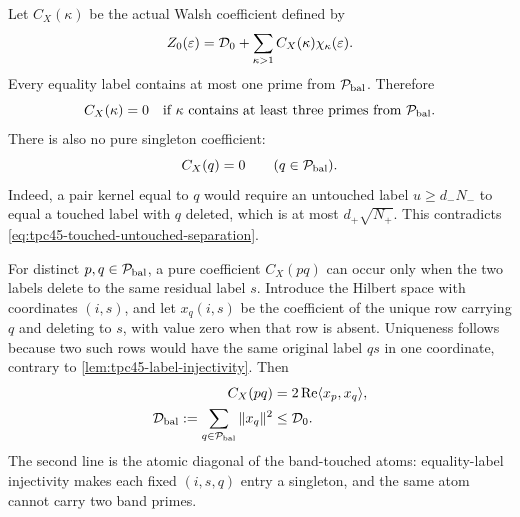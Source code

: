 Let \(C_X(\kappa)\) be the actual Walsh coefficient defined by
\begin{equation}
 Z_0(\varepsilon)
 =\mathcal D_0+\sum_{\kappa>1}C_X(\kappa)\chi_\kappa(\varepsilon).
 \label{eq:tpc45-CX-definition}
\end{equation}
Every equality label contains at most one prime from
\(\mathcal P_{\rm bal}\).  Therefore
\begin{equation}
 C_X(\kappa)=0
 \quad\text{if \(\kappa\) contains at least three primes from
 \(\mathcal P_{\rm bal}\)}.
 \label{eq:tpc45-no-three-band-primes}
\end{equation}
There is also no pure singleton coefficient:
\begin{equation}
 C_X(q)=0
 \qquad(q\in\mathcal P_{\rm bal}).
 \label{eq:tpc45-no-pure-singleton}
\end{equation}
Indeed, a pair kernel equal to \(q\) would require an untouched label
\(u\ge d_-N_-\) to equal a touched label with \(q\) deleted, which is
at most \(d_+\sqrt{N_+}\).  This contradicts
\eqref{eq:tpc45-touched-untouched-separation}.

For distinct \(p,q\in\mathcal P_{\rm bal}\), a pure coefficient \(C_X(pq)\)
can occur only when the two labels delete to the same residual label
\(s\).  Introduce the Hilbert space with coordinates \((i,s)\), and
let \(x_q(i,s)\) be the coefficient of the unique row carrying \(q\)
and deleting to \(s\), with value zero when that row is absent.
Uniqueness follows because two such rows would have the same original
label \(qs\) in one coordinate, contrary to
\cref{lem:tpc45-label-injectivity}.  Then
\begin{align}
 C_X(pq)&=2\operatorname{Re}\langle x_p,x_q\rangle,
 \label{eq:tpc45-Cpq-Gram}\\
 \mathcal D_{\rm bal}
 :=\sum_{q\in\mathcal P_{\rm bal}}\|x_q\|^2
 &\le\mathcal D_0.
 \label{eq:tpc45-band-atom-energy}
\end{align}
The second line is the atomic diagonal of the band-touched atoms:
equality-label injectivity makes each fixed \((i,s,q)\) entry a
singleton, and the same atom cannot carry two band primes.

